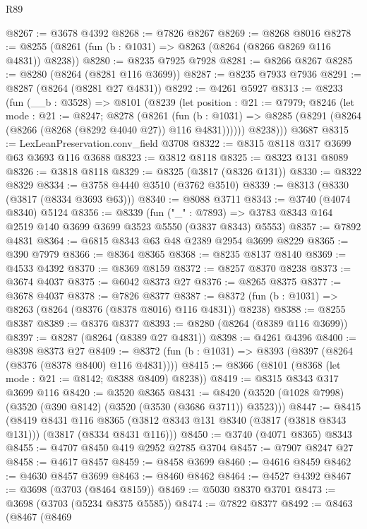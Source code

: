 \begin{lexlean}{R89}
\begin{coremodule}
@8267 := @3678 @4392
@8268 := @7826 @8267
@8269 := @8268 @8016
@8278 := @8255 (@8261 (fun (b : @1031) => @8263 (@8264 (@8266 @8269 @116 @4831)) @8238))
@8280 := @8235 @7925 @7928
@8281 := @8266 @8267
@8285 := @8280 (@8264 (@8281 @116 @3699))
@8287 := @8235 @7933 @7936
@8291 := @8287 (@8264 (@8281 @27 @4831))
@8292 := @4261 @5927
@8313 := @8233
    (fun (__b : @3528) =>
    @8101
      (@8239
        (let position : @21 := @7979;
        @8246
          (let mode : @21 := @8247;
          @8278
            (@8261
              (fun (b : @1031) =>
              @8285 (@8291 (@8264 (@8266 (@8268 (@8292 @4040 @27)) @116 @4831))))))
          @8238)))
    @3687
@8315 := LexLeanPreservation.conv_field @3708
@8322 := @8315 @8118 @317 @3699 @63 @3693 @116 @3688
@8323 := @3812 @8118
@8325 := @8323 @131 @8089
@8326 := @3818 @8118
@8329 := @8325 (@3817 (@8326 @131))
@8330 := @8322 @8329
@8334 := @3758 @4440 @3510 (@3762 @3510)
@8339 := @8313 (@8330 (@3817 (@8334 @3693 @63)))
@8340 := @8088 @3711
@8343 := @3740 (@4074 @8340) @5124
@8356 := @8339
    (fun ("_" : @7893) => @3783 @8343 @164 @2519 @140 @3699 @3699 @3523 @5550 (@3837 @8343) @5553)
@8357 := @7892 @4831
@8364 := @6815 @8343 @63 @48 @2389 @2954 @3699 @8229
@8365 := @390 @7979
@8366 := @8364 @8365
@8368 := @8235 @8137 @8140
@8369 := @4533 @4392
@8370 := @8369 @8159
@8372 := @8257 @8370 @8238
@8373 := @3674 @4037
@8375 := @6042 @8373 @27
@8376 := @8265 @8375
@8377 := @3678 @4037
@8378 := @7826 @8377
@8387 := @8372 (fun (b : @1031) => @8263 (@8264 (@8376 (@8378 @8016) @116 @4831)) @8238)
@8388 := @8255 @8387
@8389 := @8376 @8377
@8393 := @8280 (@8264 (@8389 @116 @3699))
@8397 := @8287 (@8264 (@8389 @27 @4831))
@8398 := @4261 @4396
@8400 := @8398 @8373 @27
@8409 := @8372 (fun (b : @1031) => @8393 (@8397 (@8264 (@8376 (@8378 @8400) @116 @4831))))
@8415 := @8366 (@8101 (@8368 (let mode : @21 := @8142; @8388 @8409) @8238))
@8419 := @8315 @8343 @317 @3699 @116
@8420 := @3520 @8365
@8431 := @8420 (@3520 (@1028 @7998) (@3520 (@390 @8142) (@3520 (@3530 (@3686 @3711)) @3523)))
@8447 := @8415
    (@8419
      @8431
      @116
      @8365
      (@3812 @8343 @131 @8340 (@3817 (@3818 @8343 @131)))
      (@3817 (@8334 @8431 @116)))
@8450 := @3740 (@4071 @8365) @8343
@8455 := @4707 @8450 @419 @2952 @2785 @3704
@8457 := @7907 @8247 @27
@8458 := @4617 @8457
@8459 := @8458 @3699
@8460 := @4616 @8459
@8462 := @4630 @8457 @3699
@8463 := @8460 @8462
@8464 := @4527 @4392
@8467 := @3698 (@3703 (@8464 @8159))
@8469 := @5030 @8370 @3701
@8473 := @3698 (@3703 (@5234 @8375 @5585))
@8474 := @7822 @8377
@8492 := @8463
    (@8467
      (@8469

\end{coremodule}
\end{lexlean}
